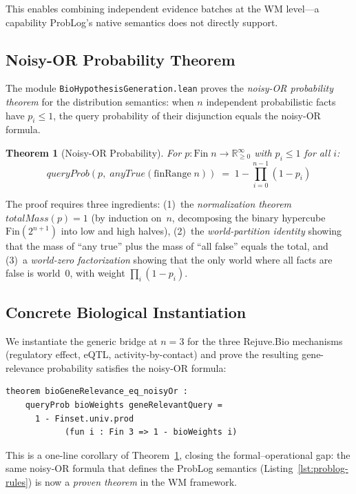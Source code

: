 \documentclass[]{article}
\newtheorem{theorem}{Theorem}
\newcommand{\code}[1]{\texttt{#1}}
\begin{document}
\noindent
This enables combining independent evidence batches at the WM level---a capability
ProbLog's native semantics does not directly support.

\subsection{Noisy-OR Probability Theorem}

The module \code{BioHypothesisGeneration.lean} proves the \emph{noisy-OR
probability theorem} for the distribution semantics: when $n$ independent
probabilistic facts have $p_i \le 1$, the query probability of their disjunction
equals the noisy-OR formula.

\begin{theorem}[Noisy-OR Probability]
\label{thm:noisy-or}
For $p : \mathrm{Fin}\;n \to \mathbb{R}_{\ge 0}^\infty$ with $p_i \le 1$ for all $i$:
\[
  \mathit{queryProb}(p,\; \mathit{anyTrue}(\mathrm{finRange}\;n))
  \;=\; 1 - \prod_{i=0}^{n-1} (1 - p_i)
\]
\end{theorem}

\noindent
The proof requires three ingredients: (1)~the \emph{normalization theorem}
$\mathit{totalMass}(p) = 1$ (by induction on~$n$, decomposing the binary
hypercube $\mathrm{Fin}(2^{n+1})$ into low and high halves), (2)~the
\emph{world-partition identity} showing that the mass of ``any true'' plus
the mass of ``all false'' equals the total, and (3)~a \emph{world-zero
factorization} showing that the only world where all facts are false is
world~0, with weight $\prod_i (1 - p_i)$.

\subsection{Concrete Biological Instantiation}

We instantiate the generic bridge at $n = 3$ for the three
Rejuve.Bio mechanisms (regulatory effect, eQTL, activity-by-contact) and
prove the resulting gene-relevance probability satisfies the noisy-OR formula:

\begin{lstlisting}[caption={Bio model noisy-OR (Lean~4)},label=lst:bio-noisy-or]
theorem bioGeneRelevance_eq_noisyOr :
    queryProb bioWeights geneRelevantQuery =
      1 - Finset.univ.prod
            (fun i : Fin 3 => 1 - bioWeights i)
\end{lstlisting}

\noindent
This is a one-line corollary of Theorem~\ref{thm:noisy-or},
closing the formal--operational gap: the same noisy-OR formula that defines
the ProbLog semantics (Listing~\ref{lst:problog-rules}) is now a
\emph{proven theorem} in the WM framework.
\end{document}
